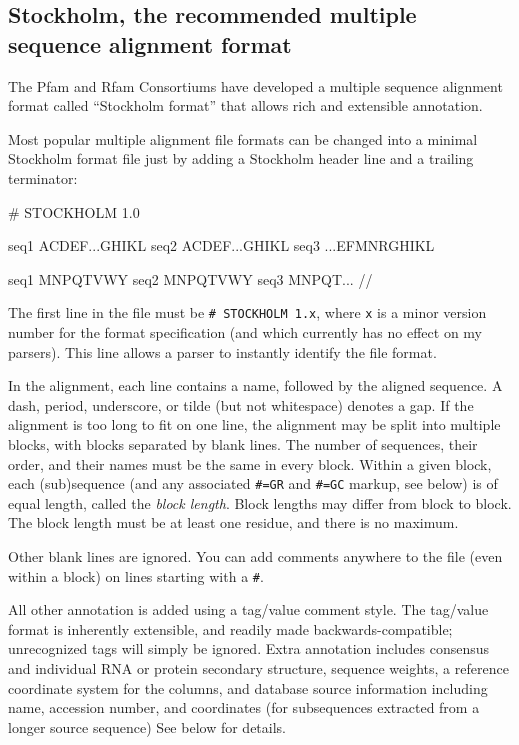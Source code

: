 \subsection{Stockholm, the recommended multiple sequence alignment format}
\label{section:stockholm}

The Pfam and Rfam Consortiums have developed a multiple sequence
alignment format called ``Stockholm format'' that allows rich and
extensible annotation. 

Most popular multiple alignment file formats can be changed into a
minimal Stockholm format file just by adding a Stockholm header line
and a trailing \prog{//} terminator:

\begin{sreoutput}
# STOCKHOLM 1.0

seq1  ACDEF...GHIKL
seq2  ACDEF...GHIKL
seq3  ...EFMNRGHIKL

seq1  MNPQTVWY
seq2  MNPQTVWY
seq3  MNPQT...
//
\end{sreoutput}

The first line in the file must be \verb+# STOCKHOLM 1.x+, where
\verb+x+ is a minor version number for the format specification
(and which currently has no effect on my parsers). This line allows a
parser to instantly identify the file format.

In the alignment, each line contains a name, followed by the aligned
sequence. A dash, period, underscore, or tilde (but not whitespace)
denotes a gap. If the alignment is too long to fit on one line, the
alignment may be split into multiple blocks, with blocks separated by
blank lines. The number of sequences, their order, and their names
must be the same in every block. Within a given block, each
(sub)sequence (and any associated \verb+#=GR+ and \verb+#=GC+ markup,
see below) is of equal length, called the \textit{block length}. Block
lengths may differ from block to block. The block length must be at
least one residue, and there is no maximum.

Other blank lines are ignored. You can add comments anywhere to the
file (even within a block) on lines starting with a \verb+#+.

All other annotation is added using a tag/value comment style. The
tag/value format is inherently extensible, and readily made
backwards-compatible; unrecognized tags will simply be ignored. Extra
annotation includes consensus and individual RNA or protein secondary
structure, sequence weights, a reference coordinate system for the
columns, and database source information including name, accession
number, and coordinates (for subsequences extracted from a longer
source sequence) See below for details.

